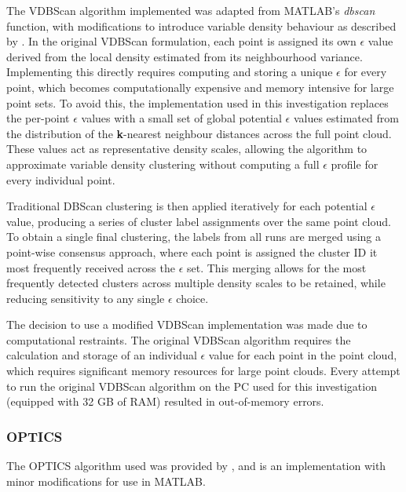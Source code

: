 The \ac{VDBScan} algorithm implemented was adapted from MATLAB's \emph{dbscan} function, with modifications to introduce variable density behaviour as described by \textcite{liuVDBSCANVariedDensity2007}. In the original \ac{VDBScan} formulation, each point is assigned its own \textbf{$\epsilon$} value derived from the local density estimated from its neighbourhood variance. Implementing this directly requires computing and storing a unique \textbf{$\epsilon$} for every point, which becomes computationally expensive and memory intensive for large point sets. To avoid this, the implementation used in this investigation replaces the per-point \textbf{$\epsilon$} values with a small set of global potential \textbf{$\epsilon$} values estimated from the distribution of the \textbf{k}-nearest neighbour distances across the full point cloud. These values act as representative density scales, allowing the algorithm to approximate variable density clustering without computing a full \textbf{$\epsilon$} profile for every individual point.

Traditional \ac{DBScan} clustering is then applied iteratively for each potential \textbf{$\epsilon$} value, producing a series of cluster label assignments over the same point cloud. To obtain a single final clustering, the labels from all runs are merged using a point-wise consensus approach, where each point is assigned the cluster ID it most frequently received across the \textbf{$\epsilon$} set. This merging allows for the most frequently detected clusters across multiple density scales to be retained, while reducing sensitivity to any single \textbf{$\epsilon$} choice.

The decision to use a modified \ac{VDBScan} implementation was made due to computational restraints. The original \ac{VDBScan} algorithm requires the calculation and storage of an individual \textbf{$\epsilon$} value for each point in the point cloud, which requires significant memory resources for large point clouds. Every attempt to run the original \ac{VDBScan} algorithm on the PC used for this investigation (equipped with 32 GB of RAM) resulted in out-of-memory errors. 

\subsubsection{OPTICS}
\label{subsec:ch6.section3.subsec4.subsubsec3}

The \ac{OPTICS} algorithm used was provided by \textcite{daszykowskiMatlabCodeOPTICS2002}, and is an implementation with minor modifications for use in MATLAB.

